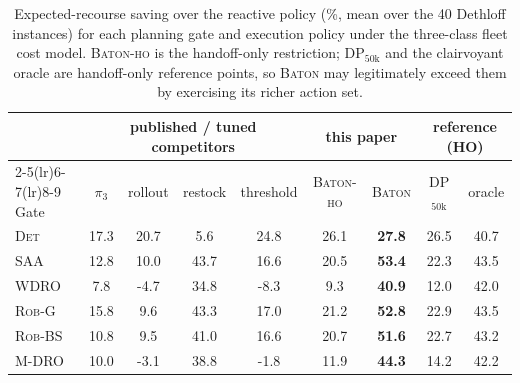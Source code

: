 \begin{table}[t]
\caption{Expected-recourse saving over the reactive policy (\%, mean over
the 40 Dethloff instances) for each planning gate and execution policy
under the three-class fleet cost model. \textsc{Baton-ho} is the
handoff-only restriction; DP$_{50\mathrm{k}}$ and the clairvoyant oracle
are handoff-only reference points, so \textsc{Baton} may legitimately
exceed them by exercising its richer action set.}
\label{tab:grand}
\centering
\small
\setlength{\tabcolsep}{3.5pt}
\begin{tabular}{l cccc cc cc}
\toprule
& \multicolumn{4}{c}{published / tuned competitors}
& \multicolumn{2}{c}{this paper} & \multicolumn{2}{c}{reference (HO)} \\
\cmidrule(lr){2-5}\cmidrule(lr){6-7}\cmidrule(lr){8-9}
Gate & $\pi_3$ & rollout & restock & threshold & \textsc{Baton-ho} & \textsc{Baton} & DP$_{50\mathrm{k}}$ & oracle \\
\midrule
\textsc{Det} & 17.3 & 20.7 & 5.6 & 24.8 & 26.1 & \textbf{27.8} & 26.5 & 40.7 \\
\textsc{SAA} & 12.8 & 10.0 & 43.7 & 16.6 & 20.5 & \textbf{53.4} & 22.3 & 43.5 \\
\textsc{WDRO} & 7.8 & -4.7 & 34.8 & -8.3 & 9.3 & \textbf{40.9} & 12.0 & 42.0 \\
\textsc{Rob-G} & 15.8 & 9.6 & 43.3 & 17.0 & 21.2 & \textbf{52.8} & 22.9 & 43.5 \\
\textsc{Rob-BS} & 10.8 & 9.5 & 41.0 & 16.6 & 20.7 & \textbf{51.6} & 22.7 & 43.2 \\
\textsc{M-DRO} & 10.0 & -3.1 & 38.8 & -1.8 & 11.9 & \textbf{44.3} & 14.2 & 42.2 \\
\bottomrule
\end{tabular}
\end{table}
